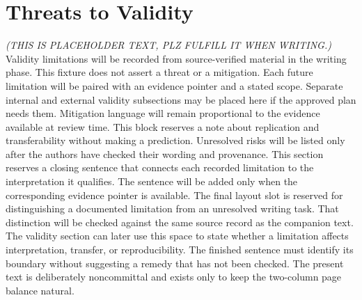 \section{Threats to Validity}\label{sec:threats-to-validity}
\textit{(THIS IS PLACEHOLDER TEXT, PLZ FULFILL IT WHEN WRITING.)}
Validity limitations will be recorded from source-verified material in the writing phase. This fixture does not assert a threat or a mitigation.
Each future limitation will be paired with an evidence pointer and a stated scope.
Separate internal and external validity subsections may be placed here if the approved plan needs them.
Mitigation language will remain proportional to the evidence available at review time.
This block reserves a note about replication and transferability without making a prediction.
Unresolved risks will be listed only after the authors have checked their wording and provenance.
This section reserves a closing sentence that connects each recorded limitation to the interpretation it qualifies. The sentence will be added only when the corresponding evidence pointer is available.
The final layout slot is reserved for distinguishing a documented limitation from an unresolved writing task. That distinction will be checked against the same source record as the companion text.
The validity section can later use this space to state whether a limitation affects interpretation, transfer, or reproducibility. The finished sentence must identify its boundary without suggesting a remedy that has not been checked. The present text is deliberately noncommittal and exists only to keep the two-column page balance natural.
